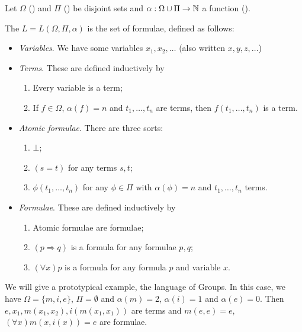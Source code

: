 \documentclass[a4paper, 10pt, twocolumn]{amsart}
\begin{document}
\begin{definition}[Language]
  Let $\Omega$ () and $\Pi$ () be disjoint sets and $\alpha: \Omega \cup \Pi \rightarrow \mathbb{N}$ a function ().

  The  $L = L(\Omega, \Pi, \alpha)$ is the set of formulae, defined as follows:
  \begin{itemize}
    \item \emph{Variables}. We have some variables $x_1, x_2, \dots$ (also written $x, y, z, \dots$)
    \item \emph{Terms}. These are defined inductively by
    \begin{enumerate}
      \item Every variable is a term;
      \item If $f \in \Omega$, $\alpha(f) = n$ and $t_1, \dots, t_n$ are terms, then $f(t_1, \dots, t_n)$ is a term.
    \end{enumerate}
    \item \emph{Atomic formulae}. There are three sorts:
    \begin{enumerate}
      \item $\bot$;
      \item $(s = t)$ for any terms $s, t$;
      \item $\phi(t_1, \dots, t_n)$ for any $\phi \in \Pi$ with $\alpha(\phi) = n$ and $t_1, \dots, t_n$ terms.
    \end{enumerate}
    \item \emph{Formulae}. These are defined inductively by
    \begin{enumerate}
      \item Atomic formulae are formulae;
      \item $(p \Rightarrow q)$ is a formula for any formulae $p, q$;
      \item $(\forall x) p$ is a formula for any formula $p$ and variable $x$.
    \end{enumerate}
  \end{itemize}
\end{definition}

\begin{example}
  We will give a prototypical example, the language of Groups. In this case, we have $\Omega = \{m , i, e\}$, $\Pi = \emptyset$ and $\alpha(m) = 2$, $\alpha(i) = 1$ and $\alpha(e) = 0$. Then $e, x_1, m(x_1, x_2), i(m(x_1, x_1))$ are terms and $m(e, e) = e$, $(\forall x)m(x, i(x)) = e$ are formulae.
\end{example}
\end{document}
